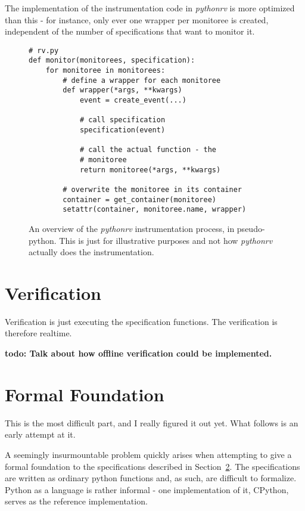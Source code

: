 \documentclass[a4paper,11pt]{kth-mag}
\newcommand{\todo}[1]{\textbf{todo: #1}}
\begin{document}
The implementation of the instrumentation code in \textit{pythonrv} is more
optimized than this - for instance, only ever one wrapper per monitoree is
created, independent of the number of specifications that want to monitor it.

\begin{figure}[h!]
	\begin{center}
	\begin{minipage}{0.7\textwidth}
	\begin{lstlisting}
# rv.py
def monitor(monitorees, specification):
	for monitoree in monitorees:
		# define a wrapper for each monitoree
		def wrapper(*args, **kwargs)
			event = create_event(...)

			# call specification
			specification(event)

			# call the actual function - the
			# monitoree
			return monitoree(*args, **kwargs)

		# overwrite the monitoree in its container
		container = get_container(monitoree)
		setattr(container, monitoree.name, wrapper)
	\end{lstlisting}
	\end{minipage}
	\end{center}

	\caption{An overview of the \textit{pythonrv} instrumentation process, in
	pseudo-python. This is just for illustrative purposes and not how
\textit{pythonrv} actually does the instrumentation.}
	\label{figure-instrumentation-overview}
\end{figure}



\section{Verification}

Verification is just executing the specification functions. The verification is
therefore realtime.

\todo{Talk about how offline verification could be implemented.}


\section{Formal Foundation} \label{section-approach-syntax}

This is the most difficult part, and I really figured it out yet. What follows
is an early attempt at it.

A seemingly insurmountable problem quickly arises when attempting to give a
formal foundation to the specifications described in
Section~\ref{section-approach-syntax}. The specifications are written as ordinary
python functions and, as such, are difficult to formalize. Python as a language
is rather informal - one implementation of it, CPython, serves as the reference
implementation.
\end{document}
